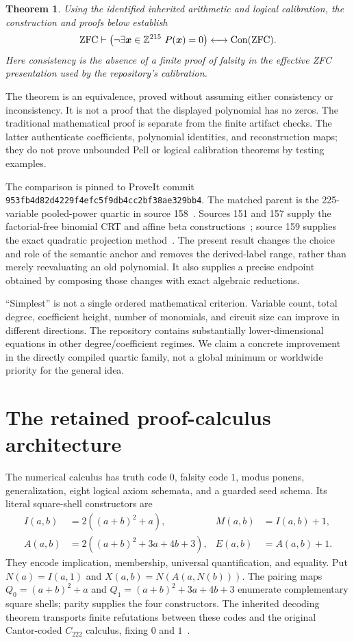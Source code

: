 \documentclass[11pt]{article}
\newtheorem{theorem}{Theorem}[section]
\theoremstyle{definition}\newtheorem{remark}[theorem]{Remark}
\newcommand{\Z}{\mathbb Z}\newcommand{\N}{\mathbb N}\newcommand{\Q}{\mathbb Q}
\newcommand{\Con}{\operatorname{Con}}
\begin{document}
\begin{theorem}\label{thm:main}
Using the identified inherited arithmetic and logical calibration,
the construction and proofs below establish
\[
\mathrm{ZFC}\vdash
\left(\neg\exists\boldsymbol x\in\Z^{\NV}\ P(\boldsymbol x)=0\right)
\longleftrightarrow\Con(\mathrm{ZFC}).
\]
Here consistency is the absence of a finite proof of falsity in the effective
ZFC presentation used by the repository's calibration.
\end{theorem}

The theorem is an equivalence, proved without assuming either consistency
or inconsistency. It is not a proof that the displayed polynomial has no
zeros. The traditional mathematical proof is separate from the finite
artifact checks. The latter authenticate coefficients, polynomial identities,
and reconstruction maps; they do not prove unbounded Pell or logical
calibration theorems by testing examples.



The comparison is pinned to ProveIt commit
\nolinkurl{953fb4d82d4229f4efc5f9db4cc2bf38ae329bb4}.
The matched parent is the 225-variable pooled-power quartic in source
158~\cite{pooled}. Sources 151 and 157 supply the factorial-free binomial
CRT and affine beta constructions~\cite{factorialfree,linearcrt}; source
159 supplies the exact quadratic projection method~\cite{projection}.
The present result changes the choice and role of the semantic anchor and
removes the derived-label range, rather than merely reevaluating an old
polynomial. It also supplies a precise endpoint obtained by composing those
changes with exact algebraic reductions.

``Simplest'' is not a single ordered mathematical criterion. Variable
count, total degree, coefficient height, number of monomials, and circuit
size can improve in different directions. The repository contains
substantially lower-dimensional equations in other degree/coefficient
regimes. We claim a concrete improvement in the directly compiled quartic
family, not a global minimum or worldwide priority for the general idea.

\section{The retained proof-calculus architecture}

The numerical calculus has truth code $0$, falsity code $1$, modus ponens,
generalization, eight logical axiom schemata, and a guarded seed schema.
Its literal square-shell constructors are
\begin{align*}
 I(a,b)&=2((a+b)^2+a),&M(a,b)&=I(a,b)+1,\\
 A(a,b)&=2((a+b)^2+3a+4b+3),&E(a,b)&=A(a,b)+1.
\end{align*}
They encode implication, membership, universal quantification, and
equality. Put $N(a)=I(a,1)$ and $X(a,b)=N(A(a,N(b)))$.
The pairing maps $Q_0=(a+b)^2+a$ and
$Q_1=(a+b)^2+3a+4b+3$ enumerate complementary square shells;
parity supplies the four constructors. The inherited decoding theorem
transports finite refutations between these codes and the original
Cantor-coded $C_{222}$ calculus, fixing $0$ and $1$~\cite{shell}.
\end{document}
